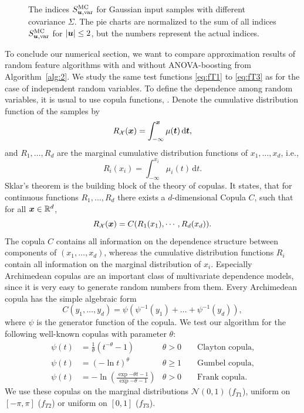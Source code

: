 \documentclass{article}
\renewcommand{\vec}[1]{\ensuremath \mathbf{\boldsymbol{#1}}}
\newcommand{\X}{\ensuremath{\mathcal{X}}}
\newcommand{\x}{\ensuremath{\vec x}}
\newcommand{\R}{\ensuremath{\mathbb{R}}}
\newcommand{\dx}{\mathrm{d}}
\theoremstyle{definition}
\numberwithin{equation}{section}
\begin{document}
\begin{figure}[htp]
\caption{The indices $S^{\text{MC}}_{\vec u,\text{var}}$ for Gaussian input samples with different covariance $\Sigma$. The pie charts are normalized to the sum of all indices $S^{\text{MC}}_{\vec u,\text{var}}$ for $|\vec u|\leq 2$, but the numbers represent the actual indices.  }
\label{fig:pie}
\end{figure}


To conclude our numerical section, we want to compare approximation results of random feature algorithms with and without ANOVA-boosting from Algorithm~\ref{alg:2}. 
We study the same test functions \eqref{eq:fT1} to \eqref{eq:fT3} as for the case of independent random variables.
To define the dependence among random variables, it is usual to use copula functions, \cite{JaDuHaRy09, Nelsen06}. Denote the cumulative distribution function of the samples by
$$R_{\X}(\x) = \int_{-\infty}^{\x} \mu(\vec t) \,\dx\vec t,$$
and $R_{1},\ldots, R_{d}$ are the marginal cumulative distribution functions of $x_1,\ldots, x_d$, i.e.,
$$R_i(x_i) = \int_{-\infty}^{x_i} \mu_i(t)\,\dx t.$$
Sklar’s theorem \cite{Skla59} is the building block of the theory of copulas. It states, that for continuous functions $R_{1},\ldots, R_{d}$ there exists a $d$-dimensional Copula $C$, such that for all $\x\in \R^d$, 
$$R_{\X}(\x) = C(R_1(x_1), \cdots, R_d(x_d)).$$
The copula $C$ contains all information on the dependence structure between components of $(x_1,\ldots, x_d)$, whereas the cumulative distribution functions $R_i$ contain all information on the marginal distribution of $x_i$. Especially Archimedean copulas are an important class of multivariate dependence models, since it is very easy to generate random numbers from them. Every Archimedean copula has the simple algebraic form
$$C(y_1,\ldots,y_d) = \psi\left(\psi^{-1}(y_1)+\ldots+ \psi^{-1}(y_d)\right),$$
where $\psi$ is the generator function of the copula.
We test our algorithm for the following well-known copulas with parameter $\theta$:
\begin{align*}
\psi(t) &= \frac{1}{\theta}\left( t^{-\theta}-1\right) &\theta> 0 &&\text{ Clayton copula,}\\
\psi(t) &= \left(-\ln t\right)^{\theta} &\theta\geq 1 &&\text{ Gumbel copula,}\\
\psi(t) &= -\ln \left(\frac{\exp{-\theta t}-1}{\exp{-\theta}-1} \right) &\theta> 0 &&\text{ Frank copula.}
\end{align*}
We use these copulas on the marginal distributions $\mathcal N(0,1)$ ($f_{T1}$), uniform on $[-\pi,\pi]$ ($f_{T2}$) or uniform on $[0,1]$ ($f_{T3}$).
\end{document}
